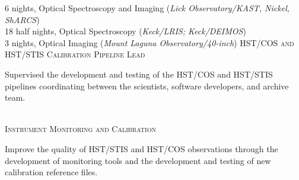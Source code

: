 \documentclass[10pt]{cv}
\begin{document}
\begin{llist}
\vspace{-0.1in}   
6 nights, Optical Spectroscopy and Imaging ({\it Lick Observatory/KAST, Nickel, ShARCS})\\
18 half nights, Optical Spectroscopy ({\it Keck/LRIS; Keck/DEIMOS})\\
3 nights, Optical Imaging ({\it Mount Laguna Observatory/40-inch})
%
\vspace{-0.1in}   
\textsc{HST/COS and HST/STIS Calibration Pipeline Lead}\\
\begin{minipage}[l]{0.7\textwidth}\vspace{0.15cm}
Supervised the development and testing of the HST/COS and HST/STIS pipelines coordinating between the scientists, software developers, and archive team. \\
\end{minipage}\vspace{0.15cm}
\\
\textsc{Instrument Monitoring and Calibration}\\
\begin{minipage}[l]{0.7\textwidth}\vspace{0.15cm}
Improve the quality of HST/STIS and HST/COS observations through the development of monitoring tools and the development and testing of new calibration reference files.\\
\end{minipage}\vspace{0.15cm}

\end{llist}
\end{document}
